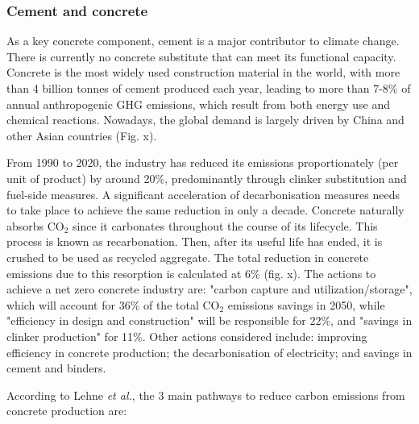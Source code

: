 \begin{enumerate}
\end{enumerate}


\subsubsection{Cement and concrete}
\label{sec:cement_and_concrete}

As a key concrete component, cement is a major contributor to climate change. There is currently no concrete substitute that can meet its functional capacity. Concrete is the most widely used construction material in the world, with more than 4 billion tonnes of cement produced each year, leading to more than 7-8\% of annual anthropogenic GHG emissions, which result from both energy use and chemical reactions.\autocite{cement2021concrete} Nowadays, the global demand is largely driven by China and other Asian countries\autocite{iea_2020} (Fig. x).

From 1990 to 2020, the industry has reduced its emissions proportionately (per unit of product) by around 20\%, predominantly through clinker substitution and fuel-side measures. A significant acceleration of decarbonisation measures needs to take place to achieve the same reduction in only a decade.\autocite{cement2021concrete} Concrete naturally absorbs CO$_2$ since it carbonates throughout the course of its lifecycle. This process is known as recarbonation. Then, after its useful life has ended, it is crushed to be used as recycled aggregate. The total reduction in concrete emissions due to this resorption is calculated at 6\%\autocite{aus_2022} (fig. x). The actions to achieve a net zero concrete industry are: "carbon capture and utilization/storage", which will account for 36\% of the total CO$_2$ emissions savings in 2050, while "efficiency in design and construction" will be responsible for 22\%, and "savings in clinker production" for 11\%. Other actions considered include: improving efficiency in concrete production; the decarbonisation of electricity; and savings in cement and binders. 

According to Lehne \textit{et al.},\autocite{lehne2018making} the 3 main pathways to reduce carbon emissions from concrete production are:

